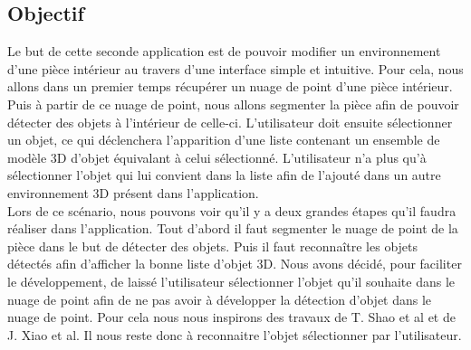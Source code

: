 
\subsection{Objectif}
Le but de cette seconde application est de pouvoir modifier un environnement d'une pièce intérieur au travers d'une interface
simple et intuitive. 
Pour cela, nous allons dans un premier temps récupérer un nuage de point d'une pièce intérieur. Puis à partir
de ce nuage de point, nous allons segmenter la pièce afin de pouvoir détecter des objets à l'intérieur de celle-ci.
L'utilisateur doit ensuite sélectionner un objet, ce qui déclenchera l'apparition d'une liste contenant un ensemble de modèle 3D
d'objet équivalant à celui sélectionné. L'utilisateur n'a plus qu'à sélectionner l'objet qui lui convient dans la liste
afin de l'ajouté dans un autre environnement 3D présent dans l'application.\\

Lors de ce scénario, nous pouvons voir qu'il y a deux grandes étapes qu'il faudra réaliser dans l'application. Tout d'abord il faut 
segmenter le nuage de point de la pièce dans le but de détecter des objets. Puis il faut reconnaître les objets détectés afin
d'afficher la bonne liste d'objet 3D. Nous avons décidé, pour faciliter le développement, de laissé l'utilisateur sélectionner
l'objet qu'il souhaite dans le nuage de point afin de ne pas avoir à développer la détection d'objet dans le nuage de point.
Pour cela nous nous inspirons des travaux de T. Shao et al\cite{interactiveSeg} et de J. Xiao et al\cite{interactionSeg2}.
Il nous reste donc à reconnaitre l'objet sélectionner par l'utilisateur.

